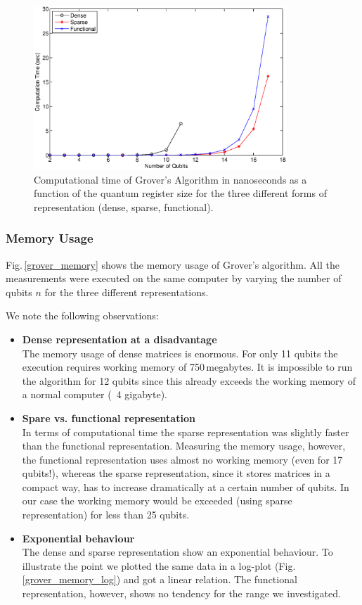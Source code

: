 \documentclass[bibliography=totocnumbered, 10pt]{article}
\theoremstyle{NoticeStyle}
\begin{document}
%
\begin{figure}[H]
	\centering
	\includegraphics[width=0.85\textwidth]{img/Grover_Time_Performance.eps}
	\caption{Computational time of Grover's Algorithm in nanoseconds as a function of the quantum register size for the three different forms of representation (dense, sparse, functional).}
	\label{grover_time_performance}
\end{figure}
%

\subsubsection{Memory Usage}

Fig.\,\ref{grover_memory} shows the memory usage of Grover's algorithm. All the measurements were executed on the same computer by varying the number of qubits $n$ for the three different representations.

We note the following observations:
\begin{itemize}
	\item\textbf{Dense representation at a disadvantage}\\
	The memory usage of dense matrices is enormous. For only 11 qubits the execution requires working memory of 750\,megabytes. It is impossible to run the algorithm for 12 qubits since this already exceeds the working memory of a normal computer (~4 gigabyte).
	\item\textbf{Spare vs. functional representation}\\
	In terms of computational time the sparse representation was slightly faster than the functional representation. Measuring the memory usage, however, the functional representation uses almost no working memory (even for 17 qubits!), whereas the sparse representation, since it stores matrices in a compact way, has to increase dramatically at a certain number of qubits. In our case the working memory would be exceeded (using sparse representation) for less than 25 qubits.
	\item\textbf{Exponential behaviour}\\
	The dense and sparse representation show an exponential behaviour. To illustrate the point we plotted the same data in a log-plot (Fig.\,\ref{grover_memory_log}) and got a linear relation. The functional representation, however, shows no tendency for the range we investigated.
\end{itemize}
\end{document}

